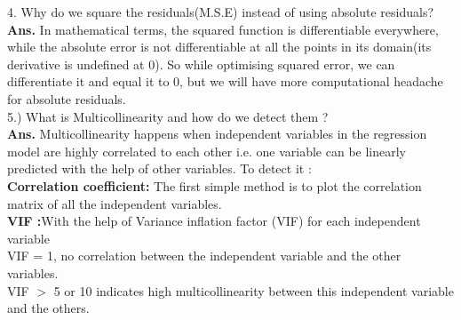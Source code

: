 \documentclass[a4paper, 11pt]{article}
\begin{document}
4. Why do we square the residuals(M.S.E) instead of using absolute residuals? \\
\textbf{Ans.}  In mathematical terms, the squared function is differentiable everywhere, while the absolute error is not differentiable at all the points 
in its domain(its derivative is undefined at 0). So while optimising squared error, we can differentiate it and equal it to 0, but we will have more computational headache for absolute residuals. \\
5.) What is Multicollinearity and how do we detect them ? 
\\ \textbf{Ans. } Multicollinearity happens when independent variables in the regression model are highly correlated to each other  i.e. one variable can be linearly predicted with the help of other variables. To detect it : \\
\textbf{ Correlation coefficient: }The first simple method is to plot the correlation matrix of all the independent variables. \\
\textbf{VIF :}With the help of Variance inflation factor (VIF) for each independent variable\\
 VIF = 1, no correlation between the independent variable and the other variables.\\
VIF $>$ 5 or 10 indicates high multicollinearity between this independent variable and the others.
\\


\end{document}
